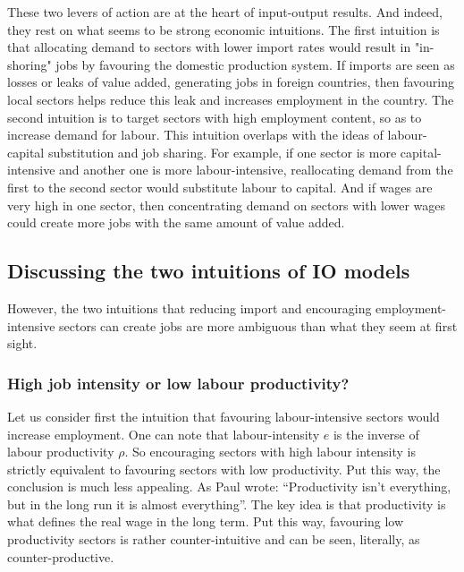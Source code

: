 These two levers of action are at the heart of input-output results. And indeed, they rest on what seems to be strong economic intuitions. 
The first intuition is that allocating demand to sectors with lower import rates would result in "in-shoring" jobs by favouring the domestic production system. If imports are seen as losses or leaks of value added, generating jobs in foreign countries, then favouring local sectors helps reduce this leak and increases employment in the country.
The second intuition is to target sectors with high employment content, so as to increase demand for labour. This intuition overlaps with the ideas of labour-capital substitution and job sharing. For example, if one sector is more capital-intensive and another one is more labour-intensive, reallocating demand from the first to the second sector would substitute labour to capital. And if wages are very high in one sector, then concentrating demand on sectors with lower wages could create more jobs with the same amount of value added.

\subsection{Discussing the two intuitions of IO models}

However, the two intuitions that reducing import and encouraging employment-intensive sectors can create jobs are more ambiguous than what they seem at first sight.

\subsubsection{High job intensity or low labour productivity?}

Let us consider first the intuition that favouring labour-intensive sectors would increase employment.
One can note that labour-intensity $e$ is the inverse of labour productivity $\rho$. 
So encouraging sectors with high labour intensity is strictly equivalent to favouring sectors with low productivity. 
Put this way, the conclusion is much less appealing. As Paul \citet{Krugman1997} wrote: “Productivity isn't everything, but in the long run it is almost everything”. The key idea is that productivity is what defines the real wage in the long term. 
Put this way, favouring low productivity sectors is rather counter-intuitive and can be seen, literally, as counter-productive.

